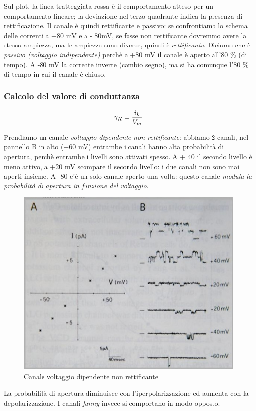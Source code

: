 \documentclass[a4paper,12pt]{article}
\begin{document}
Sul plot, la linea tratteggiata rossa è il comportamento atteso per un comportamento lineare; la deviazione nel terzo quadrante indica la presenza di rettificazione.
Il canale è quindi rettificante e passivo: se confrontiamo lo schema delle correnti a +80 mV e a - 80mV, se fosse non rettificante dovremmo avere la stessa ampiezza, ma le ampiezze sono diverse, quindi è \emph{rettificante}.
Diciamo che è \emph{passivo (voltaggio indipendente)} perchè a +80 mV il canale è aperto all'80 \% (di tempo). A -80 mV la corrente inverte (cambio segno), ma si ha comunque l'80 \% di tempo in cui il canale è chiuso.

\subsubsection{Calcolo del valore di conduttanza}
\begin{equation}
\centering
\gamma_{K}= \frac{i_{k}}{V_{m}}
\end{equation}

Prendiamo un canale \emph{voltaggio dipendente non rettificante}: abbiamo 2 canali, nel pannello B in alto (+60 mV) entrambe i canali hanno alta probabilità di apertura, perchè entrambe i livelli sono attivati spesso. A + 40 il secondo livello è meno attivo, a +20 mV scompare il secondo livello: i due canali non sono mai aperti insieme. A -80 c'è un solo canale aperto una volta: questo canale \emph{modula la probabilità di apertura in funzione del voltaggio}.

\begin{figure}[H]
\centering
\includegraphics[scale=0.4]{immagine/nonret.jpg}
\caption{Canale voltaggio dipendente non rettificante}
\end{figure} 
La probabilità di apertura diminuisce con l'iperpolarizzazione ed aumenta con la depolarizzazione. I canali \emph{funny} invece si comportano in modo opposto.
\end{document}
